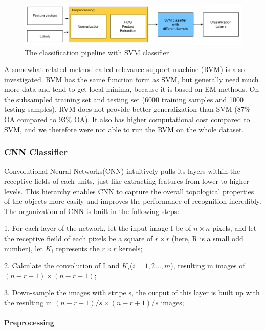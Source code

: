 \documentclass[12pt]{article}
\begin{document}
\begin{figure}[tbp]
	\centering
	\includegraphics[width =\textwidth]{pipeline-svm}		
	\caption{The classification pipeline with SVM classifier}
	\label{fig:pipeline-svm}
\end{figure}

A somewhat related method called relevance support machine (RVM) \cite{tipping2001sparse} is also investigated. RVM has the same function form as SVM, but generally need much more data and tend to get local minima, because it is based on EM methods. On the subsampled training set and testing set (6000 training samples and 1000 testing samples), RVM does not provide better generalization than SVM (87\% OA compared to 93\% OA). It also has higher computational cost compared to SVM, and we therefore were not able to run the RVM on the whole dataset.
 
\subsubsection{CNN Classifier}
Convolutional Neural Networks(CNN)\cite{krizhevsky2012imagenet} intuitively pulls its layers within the receptive fields of each units, just like extracting features from lower to higher levels. This hierarchy enables CNN to capture the overall topological properties of the objects more easily and improves the performance of recognition incredibly\cite{lecun1998gradient}.
The organization of CNN is built in the following steps: 

1. For each layer of the network, let the input image I be of $n \times n$ pixels, and let the receptive fieild of each pixels be a square of $r\times r$ (here, R is a small odd number), let $K_i$ represents the $r\times r$ kernels;

2. Calculate the convolution of I and $K_i$($i = 1,2...,m$), resulting m images of $(n-r+1) \times (n-r+1)$;

3. Down-sample the images with stripe s, the output of this layer is built up with the resulting m $(n-r+1)/s \times (n-r+1)/s$ images;
\paragraph{Preprocessing}
\end{document}
